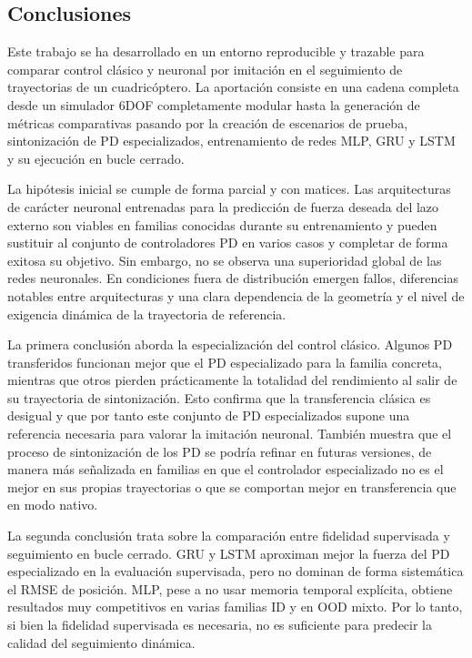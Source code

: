 \subsection{Conclusiones}

Este trabajo se ha desarrollado en un entorno reproducible y trazable para comparar
control clásico y neuronal por imitación en el seguimiento de trayectorias de un
cuadricóptero. La aportación consiste en una cadena completa desde un simulador
6DOF completamente modular hasta la generación de métricas comparativas pasando
por la creación de escenarios de prueba, sintonización de PD especializados, entrenamiento
de redes MLP, GRU y LSTM y su ejecución en bucle cerrado.

La hipótesis inicial se cumple de forma parcial y con matices. Las arquitecturas de
carácter neuronal entrenadas para la predicción de fuerza deseada del lazo externo
son viables en familias conocidas durante su entrenamiento y pueden sustituir al conjunto
de controladores PD en varios casos y completar de forma exitosa su objetivo. Sin embargo,
no se observa una superioridad global de las redes neuronales. En condiciones fuera
de distribución emergen fallos, diferencias notables entre arquitecturas y una clara
dependencia de la geometría y el nivel de exigencia dinámica de la trayectoria
de referencia.

La primera conclusión aborda la especialización del control clásico. Algunos PD
transferidos funcionan mejor que el PD especializado para la familia concreta, mientras
que otros pierden prácticamente la totalidad del rendimiento al salir de su trayectoria
de sintonización. Esto confirma que la transferencia clásica es desigual y que por tanto
este conjunto de PD especializados supone una referencia necesaria para valorar la imitación
neuronal. También muestra que el proceso de sintonización de los PD se podría refinar en
futuras versiones, de manera más señalizada en familias en que el controlador especializado
no es el mejor en sus propias trayectorias o que se comportan mejor en transferencia que en
modo nativo.

La segunda conclusión trata sobre la comparación entre fidelidad supervisada y seguimiento
en bucle cerrado. GRU y LSTM aproximan mejor la fuerza del PD especializado en la
evaluación supervisada, pero no dominan de forma sistemática el RMSE de posición. 
MLP, pese a no usar memoria temporal explícita, obtiene resultados muy competitivos
en varias familias ID y en OOD mixto. Por lo tanto, si bien la fidelidad supervisada es
necesaria, no es suficiente para predecir la calidad del seguimiento dinámica.

